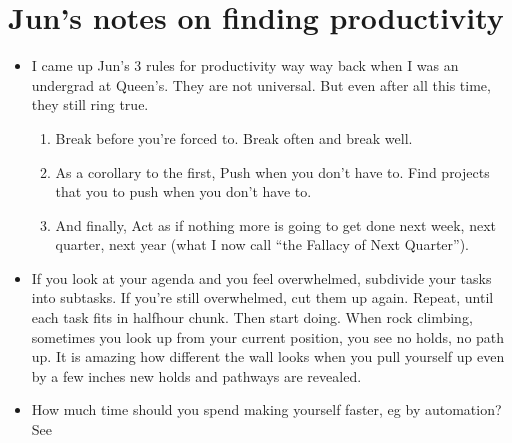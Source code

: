 \documentclass[letterpaper,10pt,english]{sphinxmanual}
\begin{document}
\section{Jun’s notes on finding productivity}
\label{\detokenize{06UserGuideToJun:jun-s-notes-on-finding-productivity}}\begin{itemize}
\item {} 
\sphinxAtStartPar
I came up Jun’s 3 rules for productivity way way back when I was an undergrad at Queen’s. They are not universal. But even after all this time, they still ring true.
\begin{enumerate}
%
\item {} 
\sphinxAtStartPar
Break before you’re forced to. Break often and break well.

\item {} 
\sphinxAtStartPar
As a corollary to the first, Push when you don’t have to. Find projects that you  to push when you don’t have to.

\item {} 
\sphinxAtStartPar
And finally, Act as if nothing more is going to get done next week, next quarter, next year (what I now call “the Fallacy of Next Quarter”).

\end{enumerate}

\item {} 
\sphinxAtStartPar
If you look at your agenda and you feel overwhelmed, subdivide your tasks into subtasks. If you’re still overwhelmed, cut them up again. Repeat, until each task fits in half\sphinxhyphen{}hour chunk. Then start doing. When rock climbing, sometimes you look up from your current position, you see no holds, no path up. It is amazing how different the wall looks when you pull yourself up even by a few inches \textendash{} new holds and pathways are revealed.

\item {} 
\sphinxAtStartPar
How much time should you spend making yourself faster, eg by automation? See 

\end{itemize}



\renewcommand{\indexname}{Index}
\printindex
\end{document}
